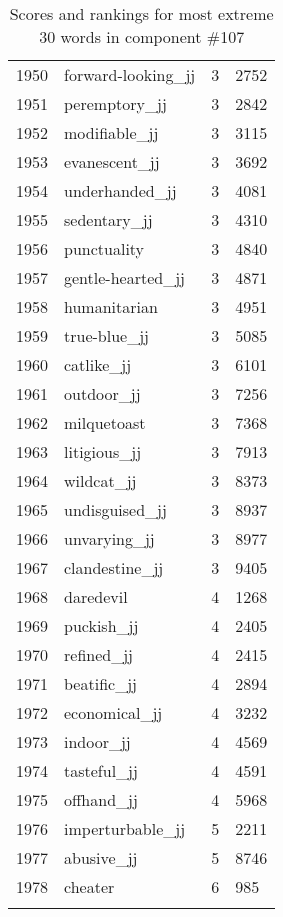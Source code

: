\begin{longtable}[!htbp]{| rlr@{.}l |}
    1950 & forward-looking\_jj & 3 & 2752 \\
    1951 & peremptory\_jj & 3 & 2842 \\
    1952 & modifiable\_jj & 3 & 3115 \\
    1953 & evanescent\_jj & 3 & 3692 \\
    1954 & underhanded\_jj & 3 & 4081 \\
    1955 & sedentary\_jj & 3 & 4310 \\
    1956 & punctuality & 3 & 4840 \\
    1957 & gentle-hearted\_jj & 3 & 4871 \\
    1958 & humanitarian & 3 & 4951 \\
    1959 & true-blue\_jj & 3 & 5085 \\
    1960 & catlike\_jj & 3 & 6101 \\
    1961 & outdoor\_jj & 3 & 7256 \\
    1962 & milquetoast & 3 & 7368 \\
    1963 & litigious\_jj & 3 & 7913 \\
    1964 & wildcat\_jj & 3 & 8373 \\
    1965 & undisguised\_jj & 3 & 8937 \\
    1966 & unvarying\_jj & 3 & 8977 \\
    1967 & clandestine\_jj & 3 & 9405 \\
    1968 & daredevil & 4 & 1268 \\
    1969 & puckish\_jj & 4 & 2405 \\
    1970 & refined\_jj & 4 & 2415 \\
    1971 & beatific\_jj & 4 & 2894 \\
    1972 & economical\_jj & 4 & 3232 \\
    1973 & indoor\_jj & 4 & 4569 \\
    1974 & tasteful\_jj & 4 & 4591 \\
    1975 & offhand\_jj & 4 & 5968 \\
    1976 & imperturbable\_jj & 5 & 2211 \\
    1977 & abusive\_jj & 5 & 8746 \\
    1978 & cheater & 6 & 985 \\
    \hline
    \caption{Scores and rankings for most extreme 30 words in component \#107} \\
\end{longtable}
